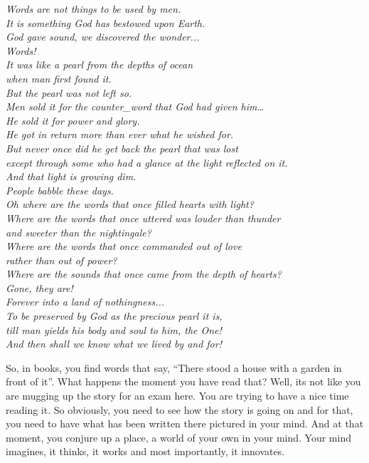\documentclass[twoside,11pt,titlepage]{article}
\begin{document}
\emph{Words are not things to be used by men.\\It is something God has bestowed upon Earth.\\God gave sound, we discovered the wonder...\\Words!\\It was like a pearl from the depths of ocean\\when man first found it.\\But the pearl was not left so.\\Men sold it for the counter\_word that God had given him…\\He sold it for power and glory.\\He got in return more than ever what he wished for.\\But never once did he get back the pearl that was lost\\except through some who had a glance at the light reflected on it.\\And that light is growing dim.\\People babble these days.\\Oh where are the words that once filled hearts with light?\\Where are the words that once uttered was louder than thunder\\and sweeter than the nightingale?\\Where are the words that once commanded out of love\\rather than out of power?\\Where are the sounds that once came from the depth of hearts?\\Gone, they are!\\Forever into a land of nothingness...\\To be preserved by God as the precious pearl it is,\\till man yields his body and soul to him, the One!\\And then shall we know what we lived by and for!}

So, in books, you find words that say, ``There stood a house with a garden in front of it''. What happens the moment you have read that? Well, its not like you are mugging up the story for an exam here. You are trying to have a nice time reading it. So obviously, you need to see how the story is going on and for that, you need to have what has been written there pictured in your mind. And at that moment, you conjure up a place, a world of your own in your mind. Your mind imagines, it thinks, it works and most importantly, it innovates.
\end{document}
